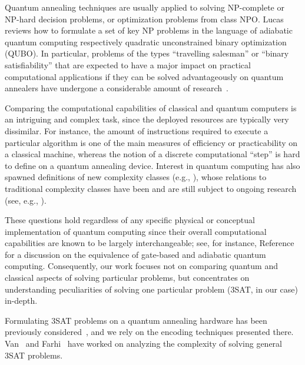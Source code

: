 Quantum annealing techniques are usually applied to solving NP-complete or NP-hard decision problems, or optimization problems from class NPO. Lucas~\cite{lucas2014ising} reviews how to formulate a set of key NP problems in the language of adiabatic quantum computing respectively quadratic unconstrained binary optimization (QUBO). In particular, problems of the types ``travelling salesman'' or ``binary satisfiability'' that are expected to have a major impact on practical computational applications if they can be solved advantageously on quantum annealers have undergone a considerable amount of research~\cite{heim2017designing,warren2017small,moylett2017quantum,strand2017zzz,benjamin2017measurement}.

Comparing the computational capabilities of classical and quantum computers is an intriguing and complex task, since the deployed resources are typically very dissimilar. For instance, the amount of instructions required to execute a particular algorithm is one of the main measures of efficiency or practicability on a classical machine, whereas the notion of a discrete computational ``step'' is hard to define on a quantum annealing device. Interest in quantum computing has also spawned definitions of new complexity classes (e.g., \cite{klauck2017complexity,morimae2017merlinization}), whose relations to traditional complexity classes have been and are still subject to ongoing research (see, e.g., \cite{bernstein1997quantum,marriott2005quantum}).


These questions hold regardless of any specific physical or conceptual implementation of quantum computing since their overall computational capabilities are known to be largely interchangeable; see, for instance, Reference~\cite{mcgeoch2014adiabatic} for a discussion on the
equivalence of gate-based and adiabatic quantum computing. Consequently,
our work focuses not on comparing quantum and classical aspects of solving particular problems, but concentrates on understanding peculiarities
of solving one particular problem (3SAT, in our case) in-depth.

Formulating 3SAT problems on a quantum annealing hardware has been previously considered~\cite{choi2011different,choi2010adiabatic,farhi2000quantum}, and we rely on the encoding techniques presented there. Van~\cite{van2001powerful} and Farhi~\cite{farhi2009quantum} have worked on analyzing the complexity of solving general 3SAT problems.
